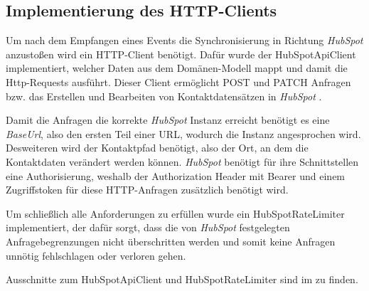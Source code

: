 \subsection{Implementierung des HTTP-Clients}
\label{sec:ImplementierungHTTPClient}
Um nach dem Empfangen eines Events die Synchronisierung in Richtung \textit{HubSpot} anzustoßen wird ein HTTP-Client benötigt.
Dafür wurde der HubSpotApiClient implementiert, welcher Daten aus dem Domänen-Modell mappt und damit die Http-Requests ausführt. 
Dieser Client ermöglicht POST und PATCH Anfragen bzw. das Erstellen und Bearbeiten von Kontaktdatensätzen in \textit{HubSpot} \cite{HubSpotApiDocs}.
\par\smallskip
Damit die Anfragen die korrekte \textit{HubSpot} Instanz erreicht benötigt es eine \textit{BaseUrl}, also den ersten Teil einer \acs{URL}, 
wodurch die Instanz angesprochen wird. Desweiteren wird der Kontaktpfad benötigt, also der Ort, an dem die Kontaktdaten verändert werden können.
\textit{HubSpot} benötigt für ihre Schnittstellen eine Authorisierung, weshalb der Authorization Header mit Bearer und einem Zugriffstoken für diese HTTP-Anfragen
zusätzlich benötigt wird.
\par\smallskip
Um schließlich alle Anforderungen zu erfüllen wurde ein HubSpotRateLimiter implementiert, der dafür sorgt, dass die von \textit{HubSpot}
festgelegten Anfragebegrenzungen nicht überschritten werden und somit keine Anfragen unnötig fehlschlagen oder verloren gehen.
\par\smallskip
Ausschnitte zum HubSpotApiClient und HubSpotRateLimiter sind im  zu finden.


